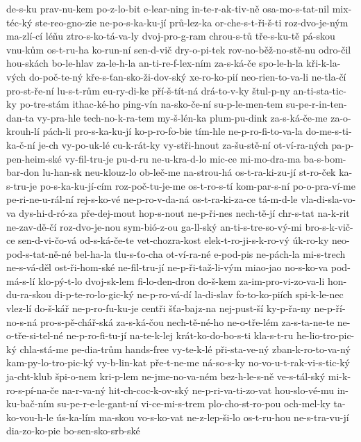 {de-s-ku
prav-nu-kem
po-z-lo-bit
e-lear-ning
in-te-r-ak-tiv-ně
osa-mo-s-tat-nil
mix-téc-ký
ste-reo-gno-zie
ne-po-s-ka-ku-jí
prů-lez-ka
or-che-s-t-ři-š-ti
roz-dvo-je-ným
ma-zlí-cí
léňu
ztro-s-ko-tá-va-ly
dvoj-pro-g-ram
chrou-s-tů
tře-s-ku-tě
pá-skou
vnu-kům
os-t-ru-ha
ko-run-ní
sen-d-vič
dry-o-pi-tek
rov-no-běž-no-stě-nu
odro-čil
hou-skách
bo-le-hlav
za-le-h-la
an-ti-re-f-lex-ním
za-s-ká-če
spo-le-h-la
kři-k-la-vých
do-poč-te-ný
kře-s-ťan-sko-ži-dov-ský
xe-ro-ko-pií
neo-rien-to-va-li
ne-tla-čí
pro-st-ře-ní
lu-s-t-rům
eu-ry-di-ke
pří-š-tít-ná
drá-to-v-ky
štul-p-ny
an-ti-sta-tic-ky
po-tre-stám
ithac-ké-ho
ping-vín
na-sko-če-ní
su-p-le-men-tem
su-pe-r-in-ten-dan-ta
vy-pra-hle
tech-no-k-ra-tem
my-š-lén-ka
plum-pu-dink
za-s-ká-če-me
za-o-krouh-lí
pách-li
pro-s-ka-ku-jí
ko-p-ro-fo-bie
tím-hle
ne-p-ro-fi-to-va-la
do-me-s-ti-ka-č-ní
je-ch
vy-po-uk-lé
cu-k-rát-ky
vy-stři-hnout
za-šu-stě-ní
ot-ví-ra-ných
pa-p-pen-heim-ské
vy-fil-tru-je
pu-d-ru
ne-u-kra-d-lo
mic-ce
mi-mo-dra-ma
ba-s-bom-bar-don
lu-han-sk
neu-klouz-lo
ob-leč-me
na-strou-há
os-t-ra-ki-zu-jí
st-ro-ček
ka-s-tru-je
po-s-ka-ku-jí-cím
roz-poč-tu-je-me
os-t-ro-s-tí
kom-par-s-ní
po-o-pra-ví-me
pe-ri-ne-u-rál-ní
rej-s-ko-vé
ne-p-ro-v-da-ná
os-t-ra-ki-za-ce
tá-m-d-le
vla-di-sla-vo-va
dys-hi-d-ró-za
pře-dej-mout
hop-s-nout
ne-p-ři-nes
nech-tě-jí
chr-s-tat
na-k-rit
ne-zav-dě-čí
roz-dvo-je-nou
sym-bió-z-ou
ga-ll-ský
an-ti-s-tre-so-vý-mi
bro-s-k-vič-ce
sen-d-vi-čo-vá
od-s-ká-če-te
vet-chozra-kost
elek-t-ro-ji-s-k-ro-vý
úk-ro-ky
neo-pod-s-tat-ně-né
bel-ha-la
tlu-s-ťo-cha
ot-ví-ra-né
e-pod-pis
ne-pách-la
mi-s-trech
ne-s-vá-děl
ost-ři-hom-ské
ne-fil-tru-jí
ne-p-ři-taž-li-vým
miao-jao
no-s-ko-va
pod-má-s-lí
klo-pý-t-lo
dvoj-sk-lem
fi-lo-den-dron
do-š-kem
za-im-pro-vi-zo-va-li
hon-du-ra-skou
di-p-te-ro-lo-gic-ký
ne-p-ro-vá-dí
la-di-slav
fo-to-ko-piích
spi-k-le-nec
vlez-lí
do-š-kář
ne-p-ro-fu-ku-je
centři
šťa-bajz-na
nej-pust-ší
ky-p-řa-ny
ne-p-ří-no-s-ná
pro-s-pě-chář-ská
za-s-ká-čou
nech-tě-né-ho
ne-o-tře-lém
za-s-ta-ne-te
ne-o-tře-si-tel-né
ne-p-ro-fi-tu-jí
na-te-k-lej
krát-ko-do-bo-s-ti
kla-s-t-ru
he-lio-tro-pic-ký
chla-stá-me
pe-dia-trům
hands-free
vy-te-k-lé
při-sta-ve-ný
zban-k-ro-to-va-ný
kam-py-lo-tro-pic-ký
vy-b-lin-kat
pře-t-ne-me
ná-so-s-ky
no-vo-u-t-rak-vi-s-tic-ký
ja-cht-klub
špi-o-nem
kri-p-lem
ne-jme-no-va-ném
bez-h-le-s-ně
ve-s-tál-ský
mi-k-ro-s-pí-na-če
na-r-va-ný
hit-ch-coc-k-ov-ský
ne-p-ri-va-ti-zo-vat
hou-slo-vé-mu
in-ku-bač-ním
su-pe-r-e-le-gant-ní
vi-ce-mi-s-trem
plo-cho-st-ro-pou
och-mel-ky
ta-ko-vou-h-le
ús-ka-lím
ma-skou
vo-s-ko-vat
ne-z-lep-ši-lo
os-t-ru-hou
ne-s-tra-vu-jí
dia-zo-ko-pie
bo-sen-sko-srb-ské
}
